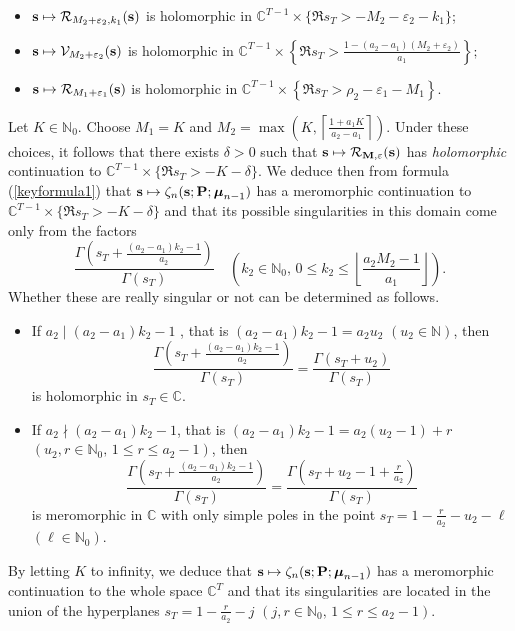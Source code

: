 \documentclass[a4paper,12pt]{article}
\theoremstyle{definition}
\numberwithin{equation}{section}
\def\N{{\mathbb N}}
\def\C{{\mathbb C}}
\def\s{{\bf s}}
\def\P{{\bf P}}
\def\M{{\bf M}}
\newcommand{\mub}{\boldsymbol{\mu}}
\def\eps{{\varepsilon}}
\begin{document}
\begin{itemize}
\item[$\bullet$] $\s \mapsto \mathcal R_{M_2+\eps_2,k_1}(\s)$ is holomorphic in $\C^{T-1}\times \{\Re s_T > -M_2-\eps_2 -k_1\}$;
\item[$\bullet$] $\s \mapsto \mathcal V_{M_2+\eps_2}(\s)$ is holomorphic in $\C^{T-1}\times \left\{\Re s_T > \frac{1-(a_2-a_1) (M_2+\eps_2)}{a_1}\right\};$
\item[$\bullet$] $\s\mapsto \mathcal R_{M_1+\eps_1}(\s)$ is holomorphic in $\C^{T-1}\times \left\{\Re s_T > \rho_2-\eps_1-M_1\right\}$.
\end{itemize}

Let $K\in \N_0$. Choose $M_1 = K$ and $M_2= \max \left(K, \left\lceil\frac{1+a_1 K}{a_2-a_1}\right\rceil\right)$.
Under these choices, it follows that there exists $\delta >0$ such that $\s\mapsto \mathcal R _{\M, {\mathbf{\eps}}} (\s)$ has {\it holomorphic} continuation to $\C^{T-1} \times \{\Re s_T > -K-\delta\}$.
We deduce then from formula (\ref{keyformula1}) that $\s \mapsto \zeta_n(\s;\P;\mub_{n-1})$ has a meromorphic continuation 
to $\C^{T-1} \times \{\Re s_T > -K-\delta\}$ and that its possible singularities in this domain come only from the factors 
$$
\frac{\Gamma \left(s_T+\frac{(a_2-a_1)k_2-1}{a_2}\right)}{\Gamma (s_T)}\quad (k_2 \in \N_0, \, 0\leq k_2\leq  \left\lfloor\frac{a_2 M_2-1}{a_1}\right\rfloor).
$$
Whether these are really singular or not can be determined as
follows.

\begin{itemize}
\item[$\bullet$] If $a_2 \mid (a_2-a_1)k_2-1$ , that is $(a_2-a_1)k_2-1= a_2 u_2$ $(u_2 \in \N)$, then
$$\frac{\Gamma \left(s_T+\frac{(a_2-a_1)k_2-1}{a_2}\right)}{\Gamma (s_T)}=\frac{\Gamma\left(s_T+u_2\right)}{\Gamma (s_T)}$$ is holomorphic in $s_T\in \C$. 
\item[$\bullet$] If $a_2 \nmid (a_2-a_1)k_2-1$, that is $(a_2-a_1)k_2-1= a_2 (u_2-1) +r$ $(u_2, r \in \N_0, \, 1\leq r\leq a_2-1)$, then
$$\frac{\Gamma \left(s_T+\frac{(a_2-a_1)k_2-1}{a_2}\right)}{\Gamma (s_T)}=\frac{\Gamma\left(s_T+u_2-1+\frac{r}{a_2}\right)}{\Gamma (s_T)}$$
is meromorphic in $\C$ with only simple poles in the point $s_T=1-\frac{r}{a_2}-u_2-\ell$ $(\ell \in \N_0)$.
\end{itemize}

By letting $K$ to infinity, we deduce that
$\s \mapsto \zeta_n(\s;\P;\mub_{n-1})$ has a meromorphic continuation to the whole space $\C^T$ and that its singularities are located in the union of the hyperplanes $s_T=1-\frac{r}{a_2}-j$ $(j, r\in \N_0, \,1\leq r \leq a_2 -1)$.
\end{document}
